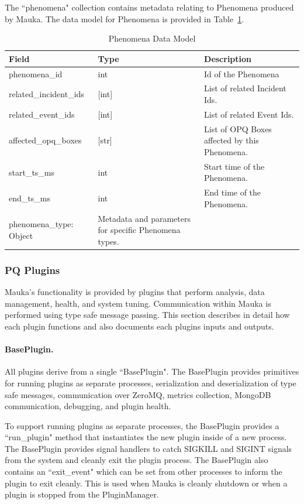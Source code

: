 The ``phenomena" collection contains metadata relating to Phenomena produced by Mauka. The data model for Phenomena is provided in Table~\ref{table:phenomena_data_model}.

\begin{table}[H]
	\centering
	\caption{Phenomena Data Model}
	\begin{tabularx}{\textwidth}{XlX}
		\toprule
		\textbf{Field} & \textbf{Type} & \textbf{Description} \\
		\midrule
		phenomena\_id & int & Id of the Phenomena \\
		related\_incident\_ids & [int] & List of related Incident Ids. \\
		related\_event\_ids & [int] & List of related Event Ids. \\
		affected\_opq\_boxes & [str] & List of OPQ Boxes affected by this Phenomena. \\
		start\_ts\_ms & int & Start time of the Phenomena. \\
		end\_ts\_ms & int & End time of the Phenomena. \\
		phenomena\_type: Object & Metadata and parameters for specific Phenomena types. \\
		\bottomrule
	\end{tabularx}
	\label{table:phenomena_data_model}
\end{table}

\subsubsection{PQ Plugins}\label{ssec:pq_plugins}
Mauka's functionality is provided by plugins that perform analysis, data management, health, and system tuning. Communication within Mauka is performed using type safe message passing. This section describes in detail how each plugin functions and also documents each plugins inputs and outputs.

\paragraph{BasePlugin.}
All plugins derive from a single ``BasePlugin". The BasePlugin provides primitives for running plugins as separate processes, serialization and deserialization of type safe messages, communication over ZeroMQ, metrics collection, MongoDB communication, debugging, and plugin health.

To support running plugins as separate processes, the BasePlugin provides a ``run\_plugin" method that instantiates the new plugin inside of a new process. The BasePlugin provides signal handlers to catch SIGKILL and SIGINT signals from the system and cleanly exit the plugin process. The BasePlugin also contains an ``exit\_event" which can be set from other processes to inform the plugin to exit cleanly. This is used when Mauka is cleanly shutdown or when a plugin is stopped from the PluginManager.

